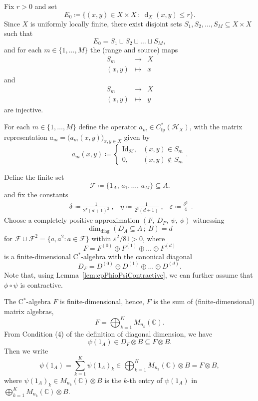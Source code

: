 \documentclass[a4paper]{amsart}
\newcommand{\myhyp}{\textnormal{-}\hskip0pt\relax}
\numberwithin{equation}{section}
\newcommand{\C}{\mathbb{C}}
\newcommand{\Fcal}{\mathcal{F}}
\newcommand{\Hcal}{\mathcal{H}}
\newcommand{\e}{\varepsilon}
\newcommand{\cstar}{C$^\ast$\myhyp{}algebra}
\newcommand{\Cfp}[1]{C^{\ast}_{\mathrm{fp}}({#1})}
\newcommand{\id}[1]{\mathrm{Id}_{#1}}
\newcommand{\rAr}{\longrightarrow}
\newcommand{\prn}[1]{{(#1)}}
\DeclareMathOperator{\dist}{d}
\newcommand{\distX}[2]{{\dist_X ( #1, #2 )}}
\newcommand{\ddimn}[3]{\dim_{\mathrm{diag}}({#1}\subseteq{#2}\, ;~{#3})}
\theoremstyle{plain}
\theoremstyle{indented}
\numberwithin{equation}{section}
\theoremstyle{definition}
\theoremstyle{remark}
\theoremstyle{plain}
\theoremstyle{definition}
\begin{document}
Fix ${r>0}$ and set 
\begin{equation*}
    E_0 \coloneq \big\{ (x,y)\in X \times X ~ \colon ~ \distX{x}{y} \le r \big\}.
\end{equation*}
Since $X$ is uniformly locally finite, there exist disjoint sets ${S_1, S_2, \hdots, S_M \subseteq X \times X}$ such that
\[{E_0 = S_1 \sqcup S_2 \sqcup \hdots \sqcup S_M},\]
  and for each ${m\in \{1,\hdots, M \}}$ the (range and source) maps 
    \[\begin{array}{ccc}
        S_m & \rAr & X\\
        (x,y) & \longmapsto &  x
    \end{array}\] 
  and
  \[\begin{array}{ccc}
        S_m & \rAr & X\\
         (x,y) & \longmapsto &  y
    \end{array}\] 
are injective.

For each ${m \in \{1,\hdots , M\}}$ define the operator ${a_m \in \Cfp{\Hcal_X}}$, with the matrix representation
${a_m = \big( a_m(x,y) \big)_{x,y \in X}}$
given by
\begin{equation*}
        a_m (x,y) \coloneq \begin{cases}
            \id{\Hcal} , & (x,y) \in S_m \\
            0, & (x,y) \notin S_m
        \end{cases}.
\end{equation*}
    
Define the finite set
\begin{equation*}
        \Fcal \coloneq \big\{ 1_A, \, a_1 ,\hdots, \, a_M \big\} \subseteq A.
\end{equation*}
and
fix the constants 
\[\begin{array}{ccc}
        \delta \coloneq \frac{1}{2^7 (d+1)^2}\;, &
        \eta \coloneq \frac{1}{2^3 (d+1)} \;, &  \e \coloneq \frac{\delta^3}{4}
\end{array}.\]
Choose a completely positive approximation ${(F,~D_F,~\psi,~\phi)}$
witnessing 
\[\ddimn{D_A}{A}{B}=d\]
for 
${\Fcal \cup \Fcal^2 = \{ a, a^2 \colon a \in \Fcal\}}$ 
within ${{\e^2}/{81}>0}$,
where
\[F=F^{(0)} \oplus F^{(1)} \oplus \hdots \oplus F^{(d)}\]
is a finite\myhyp{}dimensional \cstar{} with the canonical diagonal 
\[D_F=D^{(0)} \oplus D^{(1)} \oplus \hdots \oplus D^{(d)}.\]
Note that, using Lemma~\ref{lem:cpPhioPsiContractive}, we can further assume that ${\phi \circ \psi}$ is contractive.

The \cstar{} $F$ is finite\myhyp{}dimensional, hence, $F$ is 
the sum of (finite\myhyp{}dimensional) matrix algebras,
\begin{equation*}
         F= \bigoplus_{k=1}^K M_{n_k}\prn{\C}.
\end{equation*}
From Condition (4) of the definition of diagonal dimension, we have 
\[ \psi(1_A) \in D_F \otimes B \subseteq F \otimes B.\]
Then we write 
\[\psi(1_A) = \sum_{k=1}^K  \psi(1_A)_{k} \in \bigoplus_{k=1}^K M_{n_k}\prn{\C} \otimes B = F \otimes B , \] 
where $\psi(1_A)_{k} \in M_{n_k}\prn{\C} \otimes B$ is the $k$\myhyp{}th entry of $\psi(1_A)$ in $\bigoplus_{k=1}^K M_{n_k}\prn{\C} \otimes B$.
    
\end{document}
